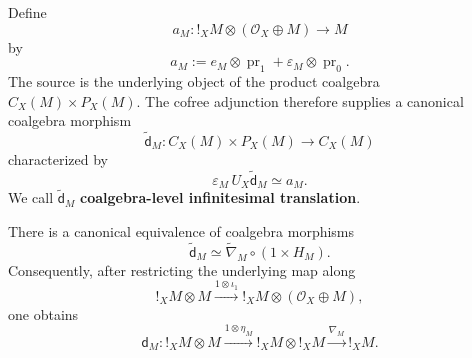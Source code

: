 \begin{construction}
\label{con:tangent-coalgebra-infinitesimal-translation}
Define
\[
    a_M:
    !_XM\otimes(\mathcal O_X\oplus M)
    \longrightarrow
    M
\]
by
\[
    a_M
    :=
    e_M\otimes\operatorname{pr}_1+\varepsilon_M\otimes\operatorname{pr}_0.
\]
The source is the underlying object of the product coalgebra
\(C_X(M)\times P_X(M)\). The cofree adjunction therefore supplies a canonical
coalgebra morphism
\[
    \widetilde{\mathsf d}_M:
    C_X(M)\times P_X(M)
    \longrightarrow
    C_X(M)
\]
characterized by
\[
    \varepsilon_M\,U_X\widetilde{\mathsf d}_M
    \simeq
    a_M.
\]
We call \(\widetilde{\mathsf d}_M\) \textbf{coalgebra-level infinitesimal
translation}.
\end{construction}

\begin{proposition}
\label{prop:infinitesimal-translation-from-codereliction}
There is a canonical equivalence of coalgebra morphisms
\[
    \widetilde{\mathsf d}_M
    \simeq
    \widetilde\nabla_M\circ(1\times H_M).
\]
Consequently, after restricting the underlying map along
\[
    !_XM\otimes M
    \xrightarrow{1\otimes\iota_1}
    !_XM\otimes(\mathcal O_X\oplus M),
\]
one obtains
\[
    \mathsf d_M:
    !_XM\otimes M
    \xrightarrow{1\otimes\eta_M}
    !_XM\otimes !_XM
    \xrightarrow{\nabla_M}
    !_XM.
\]
\end{proposition}

